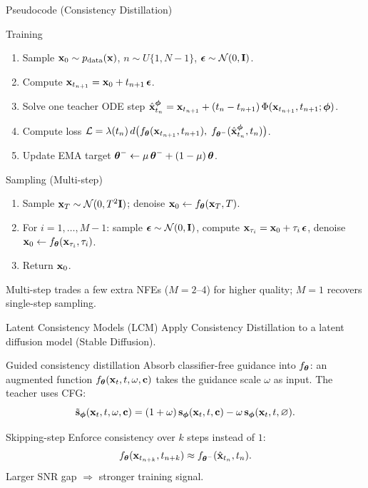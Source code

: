 \documentclass{beamer}
\begin{document}
\begin{frame}{Pseudocode (Consistency Distillation)}
	\begin{block}{Training}
		\begin{enumerate}
			\item Sample $\mathbf{x}_0 \sim p_{\text{data}}(\mathbf{x})$, $n \sim U\{1, N{-}1\}$, $\boldsymbol{\epsilon} \sim \mathcal{N}(0, \mathbf{I})$.
			\item Compute $\mathbf{x}_{t_{n+1}} = \mathbf{x}_0 + t_{n+1}\, \boldsymbol{\epsilon}$.
			\item Solve one teacher ODE step $\hat{\mathbf{x}}_{t_n}^{\boldsymbol{\phi}} = \mathbf{x}_{t_{n+1}} + (t_n - t_{n+1})\, \Phi(\mathbf{x}_{t_{n+1}}, t_{n+1}; \boldsymbol{\phi})$.
			\item Compute loss $\mathcal{L} = \lambda(t_n)\, d\bigl(f_{\boldsymbol{\theta}}(\mathbf{x}_{t_{n+1}}, t_{n+1}),\; f_{\boldsymbol{\theta}^-}(\hat{\mathbf{x}}_{t_n}^{\boldsymbol{\phi}}, t_n)\bigr)$.
			\item Update EMA target $\boldsymbol{\theta}^- \leftarrow \mu\, \boldsymbol{\theta}^- + (1 - \mu)\, \boldsymbol{\theta}$.
		\end{enumerate}
	\end{block}
	\eqpause
	\begin{block}{Sampling (Multi-step)}
		\begin{enumerate}
			\item Sample $\mathbf{x}_T \sim \mathcal{N}(0, T^2 \mathbf{I})$; denoise $\mathbf{x}_0 \leftarrow f_{\boldsymbol{\theta}}(\mathbf{x}_T, T)$.
			\item For $i = 1, \dots, M{-}1$: sample $\boldsymbol{\epsilon} \sim \mathcal{N}(0, \mathbf{I})$, compute $\mathbf{x}_{\tau_i} = \mathbf{x}_0 + \tau_i\, \boldsymbol{\epsilon}$, denoise $\mathbf{x}_0 \leftarrow f_{\boldsymbol{\theta}}(\mathbf{x}_{\tau_i}, \tau_i)$.
			\item Return $\mathbf{x}_0$.
		\end{enumerate}
	\end{block}
	\eqpause
	Multi-step trades a few extra NFEs ($M = 2$--$4$) for higher quality; $M = 1$ recovers single-step sampling.
\end{frame}
\begin{frame}{Latent Consistency Models (LCM)}
	Apply Consistency Distillation to a latent diffusion model (Stable Diffusion).
	\eqpause
	\begin{block}{Guided consistency distillation}
		Absorb classifier-free guidance into $f_{\boldsymbol{\theta}}$: an augmented function $f_{\boldsymbol{\theta}}(\mathbf{x}_t, t, \omega, \mathbf{c})$ takes the guidance scale $\omega$ as input. The teacher uses CFG:
		\vspace{-0.2cm}
		\[
			\tilde{\mathbf{s}}_{\boldsymbol{\phi}}(\mathbf{x}_t, t, \omega, \mathbf{c}) = (1 + \omega)\, \mathbf{s}_{\boldsymbol{\phi}}(\mathbf{x}_t, t, \mathbf{c}) - \omega\, \mathbf{s}_{\boldsymbol{\phi}}(\mathbf{x}_t, t, \varnothing).
		\]
	\end{block}
	\eqpause
	\begin{block}{Skipping-step}
		Enforce consistency over $k$ steps instead of $1$:
		\vspace{-0.2cm}
		\[
			f_{\boldsymbol{\theta}}(\mathbf{x}_{t_{n+k}}, t_{n+k}) \approx f_{\boldsymbol{\theta}^-}(\hat{\mathbf{x}}_{t_n}, t_n).
		\]
		Larger SNR gap $\Rightarrow$ stronger training signal.
	\end{block}
\end{frame}
\end{document}
